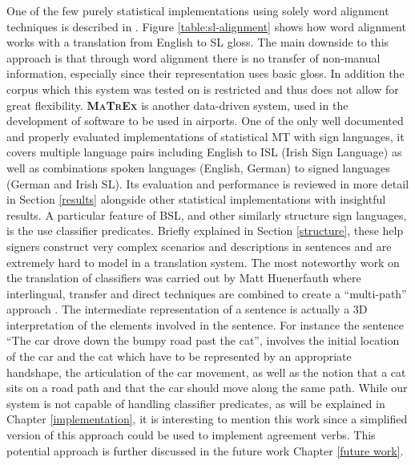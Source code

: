 \documentclass[12pt]{ociamthesis}  %
\begin{document}
One of the few purely statistical implementations using solely word alignment techniques is described in . Figure \ref{table:sl-alignment} shows how word alignment works with a translation from English to SL gloss. The main downside to this approach is that through word alignment there is no transfer of non-manual information, especially since their representation uses basic gloss. In addition the corpus which this system was tested on is restricted and thus does not allow for great flexibility. \textbf{\textsc{MaTrEx}}  is another data-driven system, used in the development of software to be used in airports. One of the only well documented and properly evaluated implementations of statistical MT with sign languages, it covers multiple language pairs including English to ISL (Irish Sign Language) as well as combinations spoken languages (English, German) to signed languages (German and Irish SL). Its evaluation and performance is reviewed in more detail in Section \ref{results} alongside other statistical implementations with insightful results. A particular feature of BSL, and other similarly structure sign languages, is the use classifier predicates. Briefly explained in Section \ref{structure}, these help signers construct very complex scenarios and descriptions in sentences and are extremely hard to model in a translation system. The most noteworthy work on the translation of classifiers was carried out by Matt Huenerfauth  where interlingual, transfer and direct techniques are combined to create a ``multi-path'' approach . The intermediate representation of a sentence is actually a 3D interpretation of the elements involved in the sentence. For instance the sentence ``The car drove down the bumpy road past the cat'', involves the initial location of the car and the cat which have to be represented by an appropriate handshape, the articulation of the car movement, as well as the notion that a cat sits on a road path and that the car should move along the same path. While our system is not capable of handling classifier predicates, as will be explained in Chapter \ref{implementation}, it is interesting to mention this work since a simplified version of this approach could be used to implement agreement verbs. This potential approach is further discussed in the future work Chapter \ref{future work}.
\end{document}
